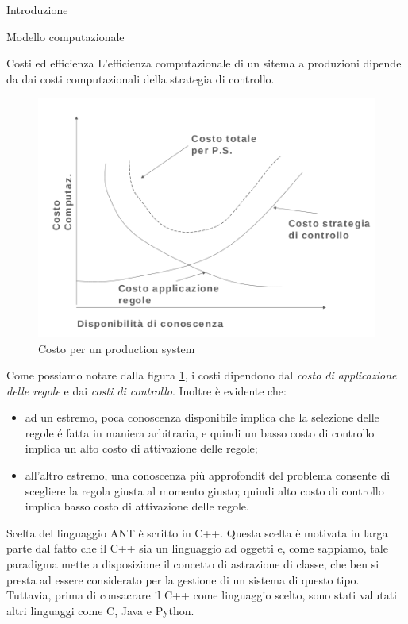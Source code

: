 \begin{chapter}{Introduzione}
\begin{section}{Modello computazionale}
	\begin{subsection}{Costi ed efficienza}
	L'efficienza computazionale di un sitema a produzioni dipende da dai costi
    computazionali della strategia di controllo. 
	\begin{figure}[!htb]
	\centering
	\includegraphics[scale=0.9]{img/costoapplicazioneregole.png}
	\caption{Costo per un production system}
	\label{fig:costoapplicazioneregole}
	\end{figure}
	
	Come possiamo notare dalla figura \ref{fig:costoapplicazioneregole}, i costi dipendono
    dal \textit{costo di applicazione delle regole} e dai \textit{costi di controllo}.
    Inoltre \`e evidente che:

	\begin{itemize}
	    \item ad un estremo, poca conoscenza disponibile implica che la selezione delle
        regole \'e fatta in maniera arbitraria, e quindi un basso costo di controllo
        implica un alto costo di attivazione delle regole;
	    \item all'altro estremo, una conoscenza pi\`u approfondit del problema consente
        di scegliere la regola giusta al momento giusto; quindi alto costo di controllo
        implica basso costo di attivazione delle regole. 	
	\end{itemize}  	
	\end{subsection}
\end{section} 


\begin{section}{Scelta del linguaggio}
ANT \`e scritto in C++. Questa scelta \`e motivata in larga parte dal fatto che
il C++ sia un linguaggio ad oggetti e, come sappiamo, tale paradigma mette a disposizione il concetto 
di astrazione di classe, che ben si presta ad essere considerato per la gestione di un 
sistema di questo tipo. Tuttavia, prima di consacrare il C++ come linguaggio scelto, 
sono stati valutati altri linguaggi come C, Java e Python.


\end{section}
\end{chapter}
